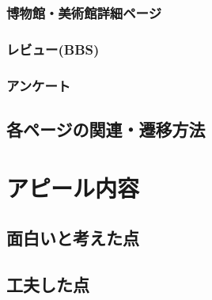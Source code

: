 \documentclass[11pt,a4paper, uplatex]{jsarticle}
\begin{document}
\subsubsection{博物館・美術館詳細ページ}
\subsubsection{レビュー(BBS)}
\subsubsection{アンケート}
\subsection{各ページの関連・遷移方法}

\section{アピール内容}
\subsection{面白いと考えた点}
\subsection{工夫した点}
\end{document}
